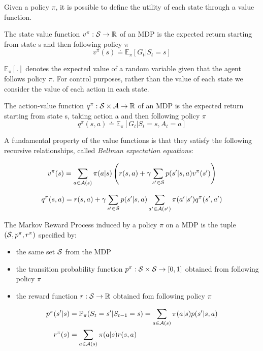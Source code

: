 Given a policy $\pi$, it is possible to define the utility of each state through a value function.
\begin{definition}
    The state value function $v^\pi: \mathcal{S} \to \mathbb{R}$ of an MDP is the expected return starting from state s and then following policy $\pi$
    \[v^\pi(s) \doteq \mathbb{E}_\pi[G_t | S_t=s]\]
\end{definition}

$\mathbb{E}_\pi[.]$ denotes the expected value of a random variable given that the agent follows policy $\pi$. 
For control purposes, rather than the value of each state we consider the value of each action in each state.
\begin{definition}
    The action-value function $q^\pi: \mathcal{S} \times \mathcal{A} \to \mathbb{R}$ of an MDP is the expected return starting from state s, taking action a and then following policy $\pi$
    \[q^\pi(s,a) \doteq \mathbb{E}_\pi[G_t | S_t=s, A_t=a]\]
\end{definition}

A fundamental property of the value functions is that they satisfy
the following recursive relationships, called \textit{Bellman expectation equations}:

\begin{equation}
    \label{eq:bellman_v}
    v^\pi(s) = \sum_{a \in \mathcal{A}(s)}\pi(a | s)\left( r(s, a) + \gamma \sum_{s' \in \mathcal{S}} p(s'|s,a) v^\pi(s') \right)
\end{equation}

\begin{equation}
\label{eq:bellman_q}
q^\pi(s,a) = r(s,a) + \gamma \sum_{s' \in \mathcal{S}} p(s'|s,a)\sum_{a' \in \mathcal{A}(s')}\pi(a'|s')q^\pi(s',a')
\end{equation}


\begin{definition}
    The Markov Reward Process induced by a policy $\pi$ on a MDP is the tuple $(\mathcal{S}, p^\pi, r^\pi)$ specified by:
    \begin{itemize}
    \item the same set $\mathcal{S}$ from the MDP
    \item the transition probability function $p^\pi: \mathcal{S} \times \mathcal{S} \to [0,1]$ obtained from following policy $\pi$
    \item the reward function $r: \mathcal{S} \to \mathbb{R}$ obtained fom following policy $\pi$
    \end{itemize}
\end{definition}
\begin{align*}
    p^\pi(s'|s) &= \mathbb{P}_\pi(S_t=s'|S_{t-1}=s) = \sum_{a \in \mathcal{A}(s)}\pi(a|s) p(s'|s,a) \\
    r^\pi(s) &= \sum_{a \in \mathcal{A}(s)}\pi(a|s) r(s, a)
\end{align*}

